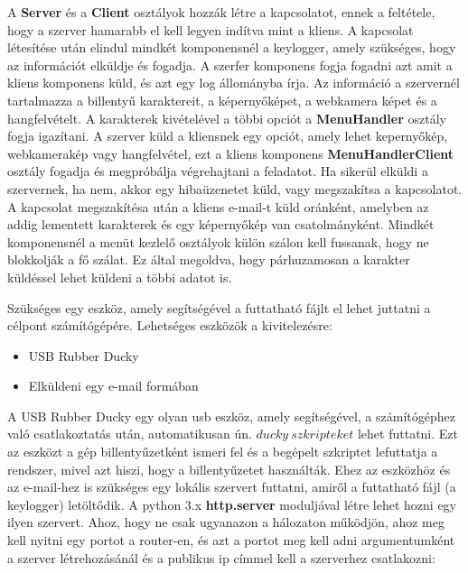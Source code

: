 \documentclass[a4paper, 11pt]{article}
\begin{document}
A \textbf{Server} és a \textbf{Client} osztályok hozzák létre a kapcsolatot, ennek a feltétele, hogy a szerver hamarabb el kell legyen indítva mint a kliens. A kapcsolat létesítése után elindul mindkét komponensnél a keylogger, amely szükséges, hogy az információt elküldje és fogadja. A szerfer komponens fogja fogadni azt amit a kliens komponens küld, és azt egy log állományba írja. Az információ a szervernél tartalmazza a billentyű karaktereit, a képernyőképet, a webkamera képet és a hangfelvételt. A karakterek kivételével a többi opciót a \textbf{MenuHandler} osztály fogja igazítani. A szerver küld a kliensnek egy opciót, amely lehet kepernyőkép, webkamerakép vagy hangfelvétel, ezt a kliens komponens \textbf{MenuHandlerClient} osztály fogadja és megpróbálja végrehajtani a feladatot. Ha sikerül elküldi a szervernek, ha nem, akkor egy hibaüzenetet küld, vagy megszakítsa a kapcsolatot. A kapcsolat megszakítésa után a kliens e-mail-t küld oránként, amelyben az addig lementett karakterek és egy képernyőkép van csatolmányként. Mindkét komponensnél a menüt kezlelő osztályok külön szálon kell fussanak, hogy ne blokkolják a fő szálat. Ez által megoldva, hogy párhuzamosan a karakter küldéssel lehet küldeni a többi adatot is.

Szükséges egy eszköz, amely segítségével a futtatható fájlt el lehet juttatni a célpont számítógépére. Lehetséges eszközök a kivitelezésre:
\begin{itemize}
\item USB Rubber Ducky
\item Elküldeni egy e-mail formában
\end{itemize}
A USB Rubber Ducky egy olyan usb eszköz, amely segítségével, a számítógéphez való csatlakoztatás után, automatikusan ún. $ducky\ szkripteket$ lehet futtatni. Ezt az eszközt a gép billentyűzetként ismeri fel és a begépelt szkriptet lefuttatja a rendszer, mivel azt hiszi, hogy a billentyűzetet használták. Ehez az eszközhöz és az e-mail-hez is szükséges egy lokális szervert futtatni, amiről a futtatható fájl (a keylogger) letöltődik. A python 3.x \textbf{http.server} moduljával létre lehet hozni egy ilyen szervert. Ahoz, hogy ne csak ugyanazon a hálozaton működjön, ahoz meg kell nyitni egy portot a router-en, és azt a portot meg kell adni argumentumként a szerver létrehozásánál és a publikus ip címmel kell a szerverhez csatlakozni:
\end{document}
